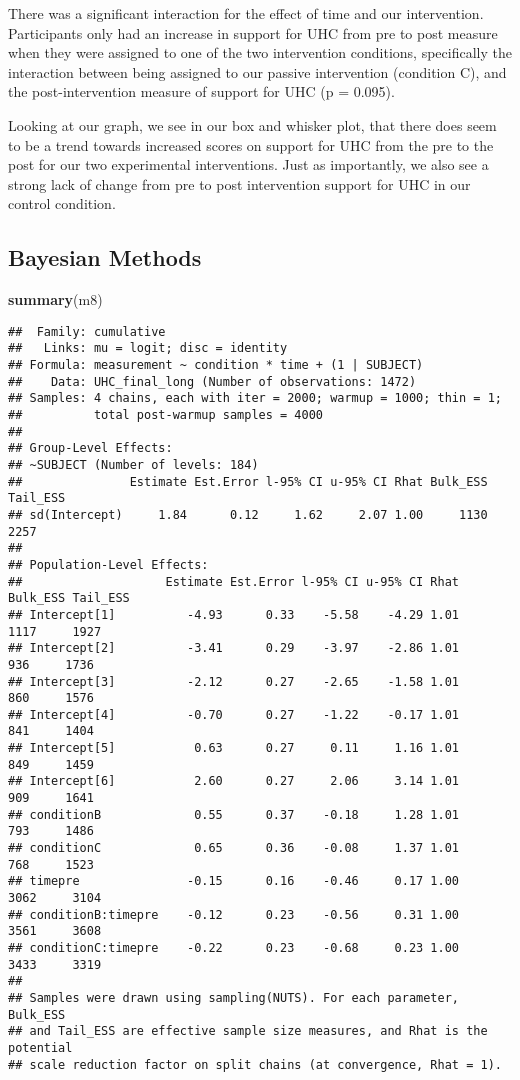 \documentclass[
]{article}
\newenvironment{Shaded}{\begin{snugshade}}{\end{snugshade}}
\newcommand{\KeywordTok}[1]{\textcolor[rgb]{0.13,0.29,0.53}{\textbf{#1}}}
\newcommand{\NormalTok}[1]{#1}
\begin{document}
There was a significant interaction for the effect of time and our
intervention. Participants only had an increase in support for UHC from
pre to post measure when they were assigned to one of the two
intervention conditions, specifically the interaction between being
assigned to our passive intervention (condition C), and the
post-intervention measure of support for UHC (p = 0.095).

Looking at our graph, we see in our box and whisker plot, that there
does seem to be a trend towards increased scores on support for UHC from
the pre to the post for our two experimental interventions. Just as
importantly, we also see a strong lack of change from pre to post
intervention support for UHC in our control condition.

\hypertarget{bayesian-methods}{%
\subsection{Bayesian Methods}\label{bayesian-methods}}

\begin{Shaded}
\begin{Highlighting}[]
\KeywordTok{summary}\NormalTok{(m8)}
\end{Highlighting}
\end{Shaded}

\begin{verbatim}
##  Family: cumulative 
##   Links: mu = logit; disc = identity 
## Formula: measurement ~ condition * time + (1 | SUBJECT) 
##    Data: UHC_final_long (Number of observations: 1472) 
## Samples: 4 chains, each with iter = 2000; warmup = 1000; thin = 1;
##          total post-warmup samples = 4000
## 
## Group-Level Effects: 
## ~SUBJECT (Number of levels: 184) 
##               Estimate Est.Error l-95% CI u-95% CI Rhat Bulk_ESS Tail_ESS
## sd(Intercept)     1.84      0.12     1.62     2.07 1.00     1130     2257
## 
## Population-Level Effects: 
##                    Estimate Est.Error l-95% CI u-95% CI Rhat Bulk_ESS Tail_ESS
## Intercept[1]          -4.93      0.33    -5.58    -4.29 1.01     1117     1927
## Intercept[2]          -3.41      0.29    -3.97    -2.86 1.01      936     1736
## Intercept[3]          -2.12      0.27    -2.65    -1.58 1.01      860     1576
## Intercept[4]          -0.70      0.27    -1.22    -0.17 1.01      841     1404
## Intercept[5]           0.63      0.27     0.11     1.16 1.01      849     1459
## Intercept[6]           2.60      0.27     2.06     3.14 1.01      909     1641
## conditionB             0.55      0.37    -0.18     1.28 1.01      793     1486
## conditionC             0.65      0.36    -0.08     1.37 1.01      768     1523
## timepre               -0.15      0.16    -0.46     0.17 1.00     3062     3104
## conditionB:timepre    -0.12      0.23    -0.56     0.31 1.00     3561     3608
## conditionC:timepre    -0.22      0.23    -0.68     0.23 1.00     3433     3319
## 
## Samples were drawn using sampling(NUTS). For each parameter, Bulk_ESS
## and Tail_ESS are effective sample size measures, and Rhat is the potential
## scale reduction factor on split chains (at convergence, Rhat = 1).
\end{verbatim}
\end{document}
